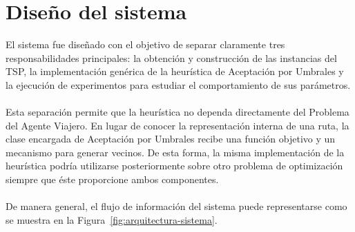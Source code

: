 \documentclass[12pt]{article}
\begin{document}
\section{Diseño del sistema}
\label{sec:diseno-sistema}

El sistema fue diseñado con el objetivo de separar claramente tres
responsabilidades principales: la obtención y construcción de las
instancias del TSP, la implementación genérica de la heurística de
Aceptación por Umbrales y la ejecución de experimentos para estudiar el
comportamiento de sus parámetros.
\\\\
Esta separación permite que la heurística no dependa directamente del
Problema del Agente Viajero. En lugar de conocer la representación interna
de una ruta, la clase encargada de Aceptación por Umbrales recibe una
función objetivo y un mecanismo para generar vecinos. De esta forma, la
misma implementación de la heurística podría utilizarse posteriormente
sobre otro problema de optimización siempre que éste proporcione ambos
componentes.
\\\\
De manera general, el flujo de información del sistema puede representarse
como se muestra en la Figura~\ref{fig:arquitectura-sistema}.
\end{document}
